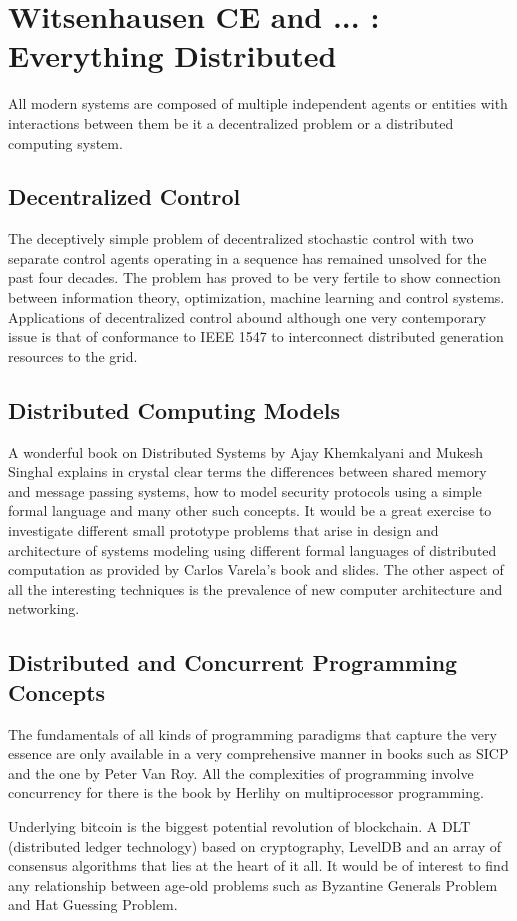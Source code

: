 \documentclass[11pt]{amsart}
\begin{document}
\section{Witsenhausen CE and ... : Everything Distributed}
All modern systems are composed of multiple independent agents or entities with interactions between them be it a decentralized problem or a distributed computing system.
\subsection{Decentralized Control}
The deceptively simple problem of decentralized stochastic control with two separate control agents operating in a sequence has remained unsolved for the past four decades. The problem has proved to be very fertile to show connection between information theory, optimization, machine learning and control systems. Applications of decentralized control abound although one very contemporary issue is that of conformance to IEEE 1547 to interconnect distributed generation resources to the grid. 

\subsection{Distributed Computing Models}
A wonderful book on Distributed Systems by Ajay Khemkalyani and Mukesh Singhal explains in crystal clear terms the differences between shared memory and message passing systems, how to model security protocols using a simple formal language and many other such concepts. It would be a great exercise to investigate different small prototype problems that arise in design and architecture of systems modeling using different formal languages of distributed computation as provided by Carlos Varela's book and slides. The other aspect of all the interesting techniques is the prevalence of new computer architecture and networking. 


\subsection{Distributed and Concurrent Programming Concepts}
The fundamentals of all kinds of programming paradigms that capture the very essence are only available in a very comprehensive manner in books such as SICP and the one by Peter Van Roy. All the complexities of programming involve concurrency for there is the book by Herlihy on multiprocessor programming. 

Underlying bitcoin is the biggest potential revolution of blockchain. A DLT (distributed ledger technology) based on cryptography, LevelDB and an array of consensus algorithms that lies at the heart of it all. It would be of interest to find any relationship between age-old problems such as Byzantine Generals Problem and Hat Guessing Problem. 
\end{document}
